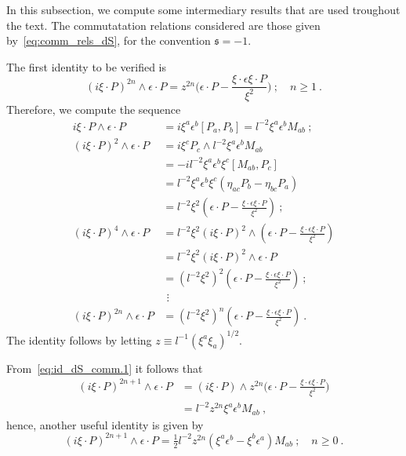 \documentclass[11pt]{article}
\begin{document}
In this subsection, we compute some intermediary results that are 
used troughout the text. The commutatation relations considered 
are those given by~\eqref{eq:comm_rels_dS}, for the convention 
$\mathfrak{s} = -1$.

The first identity to be verified is
%
\begin{equation}\label{eq:id_dS_comm.1}
	(i\xi\cdot P)^{2n} \wedge \epsilon\cdot P = z^{2n} 
	\bigg(\epsilon\cdot P - \frac{\xi\cdot\epsilon \xi\cdot 
		P}{\xi^2} \bigg)~;\quad n \geqslant 1~.
\end{equation}
Therefore, we compute the sequence
\begin{align*}
	i\xi\cdot P \wedge \epsilon\cdot P
	&= i\xi^a\epsilon^b [P_a,P_b] = l^{-2} \xi^a\epsilon^b 
	M_{ab}~;
	\\
	(i\xi\cdot P)^2 \wedge \epsilon\cdot P
	&= i\xi^c P_c \wedge l^{-2} \xi^a\epsilon^b M_{ab} \\
	&= -il^{-2} \xi^a\epsilon^b\xi^c [M_{ab},P_c] \\
	&= l^{-2}\xi^a\epsilon^b\xi^c (\eta_{ac}P_b - \eta_{bc}P_a) \\
	&= l^{-2} \xi^2 \left(\epsilon\cdot P - \frac{\xi\cdot\epsilon 
			\xi\cdot P}{\xi^2} \right)~;
	\\
	(i\xi\cdot P)^4 \wedge \epsilon\cdot P
	&= l^{-2}\xi^2(i\xi\cdot P)^2 \wedge \left(\epsilon\cdot P - 
		\frac{\xi\cdot\epsilon \xi\cdot P}{\xi^2} \right) \\
	&= l^{-2}\xi^2(i\xi\cdot P)^2 \wedge \epsilon\cdot P \\
	&= (l^{-2}\xi^2)^2 \left(\epsilon\cdot P - 
		\frac{\xi\cdot\epsilon \xi\cdot P}{\xi^2} \right)~; \\
	&~\,\vdots
	\\
	(i\xi\cdot P)^{2n} \wedge \epsilon\cdot P
	&= (l^{-2}\xi^2)^n \left(\epsilon\cdot P - 
		\frac{\xi\cdot\epsilon \xi\cdot P}{\xi^2} \right)~.
\end{align*}
The identity follows by letting $z \equiv 
l^{-1}(\xi^a\xi_a)^{1/2}$.

From~\eqref{eq:id_dS_comm.1} it follows that
%
\begin{displaymath}
\begin{split}
	(i\xi\cdot P)^{2n+1} \wedge \epsilon\cdot P
	&= (i\xi\cdot P) \wedge z^{2n} \bigg(\epsilon\cdot P - 
	\frac{\xi\cdot\epsilon \xi\cdot P}{\xi^2} \bigg) \\
	&= l^{-2}z^{2n} \xi^a \epsilon^b M_{ab}~,
\end{split}
\end{displaymath}
hence, another useful identity is given by
%
\begin{equation}\label{eq:id_dS_comm.2}
	(i\xi\cdot P)^{2n+1} \wedge \epsilon\cdot P = 
	\tfrac{1}{2}l^{-2}z^{2n} (\xi^a\epsilon^b - \xi^b\epsilon^a) 
	M_{ab}~;\quad n \geqslant 0~.
\end{equation}
\end{document}

